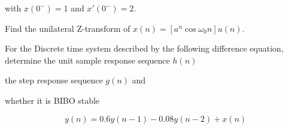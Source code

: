 with $x(0^-) = 1$ and $x'(0^-) = 2$.
\ene

\item Find the unilateral Z-transform of $x(n) = [ a^n \cos \omega_0 n] u(n).$
\Or 
\item For the Discrete time system described by the following difference equation,
  determine 
\iitem the unit sample response sequence $h(n)$
\item the step response sequence $g(n)$ and
\item whether it is BIBO stable

\[ y(n) = 0.6 y(n - 1) - 0.08 y(n - 2) + x(n)\]
\ene 

\markC
\ene 
